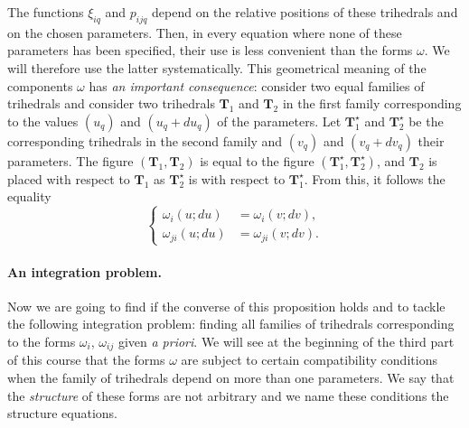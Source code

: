 The functions $\xi_{iq}$ and $p_{ijq}$ depend on the relative positions of these trihedrals and on the chosen parameters. Then, in every equation where none of these parameters has been specified, their use is less convenient than the forms $\omega$. We will therefore use the latter systematically. This geometrical meaning of the components $\omega$ has \emph{an important consequence}: consider two equal families of trihedrals and consider two trihedrals $\mathbf{T}_{1}$ and $\mathbf{T}_{2}$ in the first family corresponding to the values $(u_{q})$ and $(u_{q}+du_{q})$ of the parameters. Let $\mathbf{T}^{\star}_{1}$ and $\mathbf{T}^{\star}_{2}$ be the corresponding trihedrals in the second family and $(v_{q})$ and $(v_{q}+dv_{q})$ their parameters. The figure $(\mathbf{T}_{1},\mathbf{T}_{2})$ is equal to the figure $(\mathbf{T}^{\star}_{1},\mathbf{T}^{\star}_{2})$, and $\mathbf{T}_{2}$ is placed with respect to $\mathbf{T}_{1}$ as $\mathbf{T}^{\star}_{2}$ is with respect to $\mathbf{T}^{\star}_{1}$. From this, it follows the equality
\begin{equation}
  \label{eq:1.5}
  \left\{
    \begin{aligned}
      \omega_{i}(u;du)&=\omega_{i}(v;dv),\\
      \omega_{ji}(u;du)&=\omega_{ji}(v;dv).
    \end{aligned}
  \right.
\end{equation}

\paragraph{An integration problem.}
\label{sec:5}
Now we are going to find if the converse of this proposition holds and to tackle the following integration problem: finding all families of trihedrals corresponding to the forms $\omega_{i}$, $\omega_{ij}$ given \emph{a priori}. We will see at the beginning of the third part of this course that the forms $\omega$ are subject to certain compatibility conditions when the family of trihedrals depend on more than one parameters. We say that the \emph{structure} of these forms are not arbitrary and we name these conditions the structure equations.

